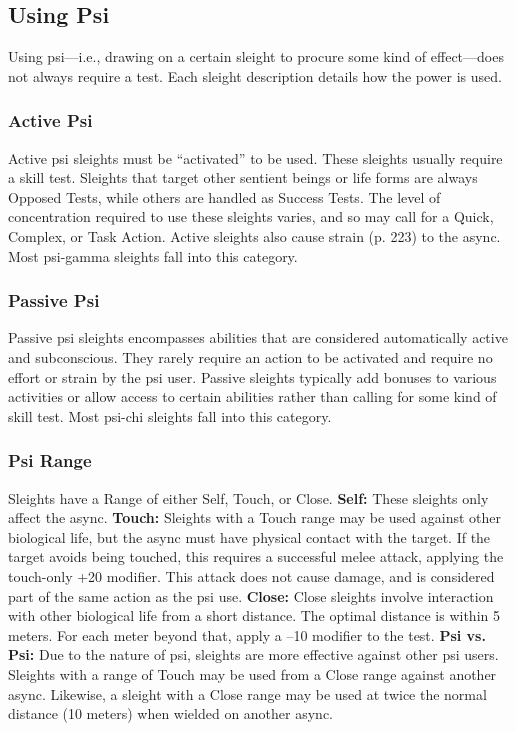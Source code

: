 \subsection{Using Psi}

Using psi—i.e., drawing on a certain sleight to procure
some kind of effect—does not always require a
test. Each sleight description details how the power 
is used.

\subsubsection{Active Psi}

Active psi sleights must be ``activated'' to be used. 
These sleights usually require a skill test. Sleights that 
target other sentient beings or life forms are always 
Opposed Tests, while others are handled as Success 
Tests. The level of concentration required to use these 
sleights varies, and so may call for a Quick, Complex, 
or Task Action. Active sleights also cause strain (p. 
223) to the async. Most psi-gamma sleights fall into 
this category.

\subsubsection{Passive Psi}

Passive psi sleights encompasses abilities that are considered
automatically active and subconscious. They
rarely require an action to be activated and require 
no effort or strain by the psi user. Passive sleights typically
add bonuses to various activities or allow access
to certain abilities rather than calling for some kind of 
skill test. Most psi-chi sleights fall into this category.

\subsubsection{Psi Range}

Sleights have a Range of either Self, Touch, or Close.
\textbf{Self:} These sleights only affect the async.
\textbf{Touch:} Sleights with a Touch range may be used 
against other biological life, but the async must have 
physical contact with the target. If the target avoids 
being touched, this requires a successful melee attack, 
applying the touch-only +20 modifier.  This  attack 
does not cause damage, and is considered part of the 
same action as the psi use.
\textbf{Close:} Close sleights involve interaction with other 
biological life from a short distance. The optimal distance
is within 5 meters. For each meter beyond that,
apply a –10 modifier to the test.
\textbf{Psi vs. Psi:} Due to the nature of psi, sleights are 
more effective against other psi users. Sleights with 
a range of Touch may be used from a Close range 
against another async. Likewise, a sleight with a Close 
range may be used at twice the normal distance (10 
meters) when wielded on another async.

